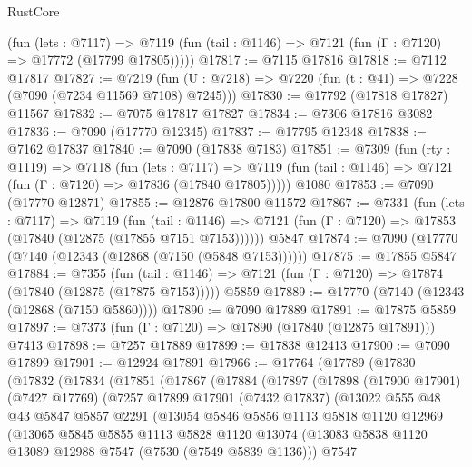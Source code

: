 \begin{lexlean}{RustCore}
\begin{coremodule}
      (fun (lets : @7117) =>
      @7119 (fun (tail : @1146) => @7121 (fun (Γ : @7120) => @17772 (@17799 @17805)))))
@17817 := @7115 @17816
@17818 := @7112 @17817
@17827 := @7219
    (fun (U : @7218) => @7220 (fun (t : @41) => @7228 (@7090 (@7234 @11569 @7108) @7245)))
@17830 := @17792 (@17818 @17827) @11567
@17832 := @7075 @17817 @17827
@17834 := @7306 @17816 @3082
@17836 := @7090 (@17770 @12345)
@17837 := @17795 @12348
@17838 := @7162 @17837
@17840 := @7090 (@17838 @7183)
@17851 := @7309
    (fun (rty : @1119) =>
    @7118
      (fun (lets : @7117) =>
      @7119 (fun (tail : @1146) => @7121 (fun (Γ : @7120) => @17836 (@17840 @17805)))))
    @1080
@17853 := @7090 (@17770 @12871)
@17855 := @12876 @17800 @11572
@17867 := @7331
    (fun (lets : @7117) =>
    @7119
      (fun (tail : @1146) =>
      @7121 (fun (Γ : @7120) => @17853 (@17840 (@12875 (@17855 @7151 @7153))))))
    @5847
@17874 := @7090 (@17770 (@7140 (@12343 (@12868 (@7150 (@5848 @7153))))))
@17875 := @17855 @5847
@17884 := @7355
    (fun (tail : @1146) => @7121 (fun (Γ : @7120) => @17874 (@17840 (@12875 (@17875 @7153)))))
    @5859
@17889 := @17770 (@7140 (@12343 (@12868 (@7150 @5860))))
@17890 := @7090 @17889
@17891 := @17875 @5859
@17897 := @7373 (fun (Γ : @7120) => @17890 (@17840 (@12875 @17891))) @7413
@17898 := @7257 @17889
@17899 := @17838 @12413
@17900 := @7090 @17899
@17901 := @12924 @17891
@17966 := @17764
    (@17789
      (@17830
        (@17832
          (@17834
            (@17851
              (@17867
                (@17884
                  (@17897
                    (@17898
                      (@17900 @17901)
                      (@7427 @17769)
                      (@7257
                        @17899
                        @17901
                        (@7432 @17837)
                        (@13022
                          @555
                          @48
                          @43
                          @5847
                          @5857
                          @2291
                          (@13054
                            @5846
                            @5856
                            @1113
                            @5818
                            @1120
                            @12969
                            (@13065
                              @5845
                              @5855
                              @1113
                              @5828
                              @1120
                              @13074
                              (@13083 @5838 @1120 @13089 @12988 @7547 (@7530 (@7549 @5839 @1136)))
                              @7547

\end{coremodule}
\end{lexlean}
